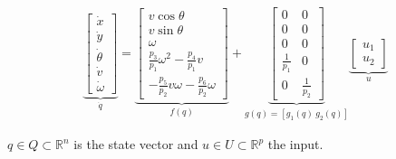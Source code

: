 \documentclass[letterpaper, 10 pt, conference]{ieeeconf}  %
\begin{document}
\begin{eqnarray}
\underbrace{\left[\begin{array}{c}
\dot{x}\\
\dot{y}\\
\dot{\theta}\\
\dot{v}\\
\dot{\omega}
\end{array}\right]}_{\dot{q}} =
\underbrace{\left[\begin{array}{c}
v\cos\theta\\
v\sin\theta\\
\omega\\
\frac{p_3}{p_1}\omega^2 - \frac{p_4}{p_1}v\\
-\frac{p_5}{p_2}v\omega - \frac{p_6}{p_2}\omega
\end{array}\right]}_{f(q)}+
\underbrace{\left[\begin{array}{cc}
0 & 0\\
0 & 0\\
0 & 0\\
\frac{1}{p_1} & 0\\
0 & \frac{1}{p_2}
\end{array}\right]}_{g(q) = [g_1(q)\ g_2(q)]}
\underbrace{\left[\begin{array}{c}
u_1\\
u_2
\end{array}\right]}_{u}
\label{eq:extendedModel}
\end{eqnarray}

$q \in Q \subset \mathds{R}^n$ is the state vector and $u \in U \subset \mathds{R}^p$ the input.
\end{document}

